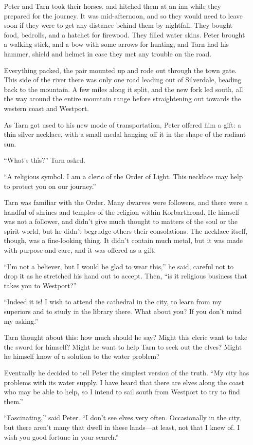 Peter and Tarn took their horses, and hitched them at an inn while they prepared for the journey.  It was mid-afternoon, and so they would need to leave soon if they were to get any distance behind them by nightfall.  They bought food, bedrolls, and a hatchet for firewood. They filled water skins.  Peter brought a walking stick, and a bow with some arrows for hunting, and Tarn had his hammer, shield and helmet in case they met any trouble on the road.

Everything packed, the pair mounted up and rode out through the town gate.  This side of the river there was only one road leading out of Silverdale, heading back to the mountain.  A few miles along it split, and the new fork led south, all the way around the entire mountain range before straightening out towards the western coast and Westport.

As Tarn got used to his new mode of transportation, Peter offered him a gift: a thin silver necklace, with a small medal hanging off it in the shape of the radiant sun.

``What's this?'' Tarn asked.

``A religious symbol.  I am a cleric of the Order of Light.  This necklace may help to protect you on our journey.''

Tarn was familiar with the Order.  Many dwarves were followers, and there were a handful of shrines and temples of the religion within Korbarthrond.  He himself was not a follower, and didn't give much thought to matters of the soul or the spirit world, but he didn't begrudge others their consolations.  The necklace itself, though, was a fine-looking thing.  It didn't contain much metal, but it was made with purpose and care, and it was offered as a gift.

``I'm not a believer, but I would be glad to wear this,'' he said, careful not to drop it as he stretched his hand out to accept.  Then, ``is it religious business that takes you to Westport?''

``Indeed it is!  I wish to attend the cathedral in the city, to learn from my superiors and to study in the library there.  What about you?  If you don't mind my asking.''

Tarn thought about this: how much should he say?  Might this cleric want to take the sword for himself?  Might he want to help Tarn to seek out the elves?  Might he himself know of a solution to the water problem?

Eventually he decided to tell Peter the simplest version of the truth.  ``My city has problems with its water supply.  I have heard that there are elves along the coast who may be able to help, so I intend to sail south from Westport to try to find them.''

``Fascinating,'' said Peter.  ``I don't see elves very often.  Occasionally in the city, but there aren't many that dwell in these lands---at least, not that I knew of.  I wish you good fortune in your search.''

